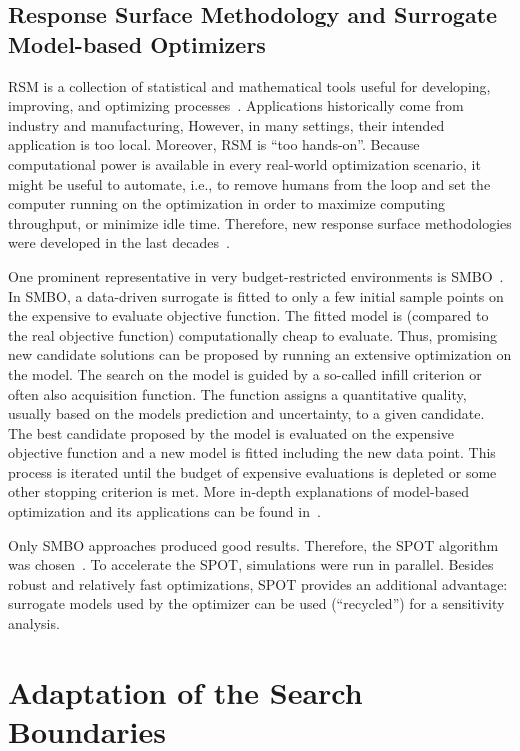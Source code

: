 \documentclass[conference]{IEEEtran}
\begin{document}
\subsection{Response Surface Methodology and Surrogate Model-based Optimizers}\label{sec:rsm}
\gls{RSM} is a collection of statistical and mathematical tools useful for developing, improving, and optimizing processes~\citep{Myers2016}. 
Applications historically come from industry and manufacturing, 
However, in many settings, their intended application is too local. Moreover, \gls{RSM} is ``too hands-on''.
Because computational power is available in every real-world optimization scenario, 
it might be useful to automate, i.e., to remove humans from the loop and set the computer running on the optimization in order to maximize computing throughput, or minimize idle time. 
Therefore, new response surface methodologies were developed in the last decades~\citep{Gram20a}.
 
 One prominent representative in very budget-restricted environments is \gls{SMBO}~\citep{Jin11a}.
In \gls{SMBO}, a data-driven surrogate is fitted to only a few initial sample points on the expensive to evaluate objective function. 
The fitted model is (compared to the real objective function) computationally cheap to evaluate.
Thus, promising new candidate solutions can be proposed by running an extensive optimization on the model.
The search on the model is guided by a so-called infill criterion or often also acquisition function.
The function assigns a quantitative quality, usually based on the models prediction and uncertainty, to a given candidate.
The best candidate proposed by the model is evaluated on the expensive objective function and a new model is fitted including the new data point.
This process is iterated until the budget of expensive evaluations is depleted or some other stopping criterion is met. More in-depth explanations of model-based optimization and its applications can be found in~\citet{Quei05a, EGOB02, Jin19a}.

Only \gls{SMBO} approaches produced good results. 
Therefore, the \gls{SPOT} algorithm was chosen~\citep{Bart17parxiv}.
To accelerate the \gls{SPOT}, simulations were run in parallel.
Besides robust and relatively fast optimizations, \gls{SPOT} provides an additional advantage: surrogate models used by the optimizer can be used (``recycled'') for a sensitivity analysis. 

\section{Adaptation of the Search Boundaries}\label{sec:adaptation}
\end{document}
